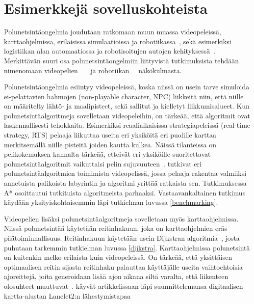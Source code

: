 \section{Esimerkkejä sovelluskohteista}\label{eSuovelluskohteista}
Polunetsintäongelmia joudutaan ratkomaan muun muassa videopeleissä, 
karttaohjelmissa, erilaisissa simulaatioissa ja 
robotiikassa~\cite{ACMHindawi}, sekä esimerkiksi logistiikan alan 
automaatiossa ja robotisoitujen autojen kehityksessä~\cite{arXivMAPF}. 
Merkittävän suuri osa polunetsintäongelmiin liittyvistä tutkimuksista tehdään 
nimenomaan 
videopelien~\cite{MathewAndMalathy}~\cite{ACMHindawi}~\cite{mazeGameTrilogi}
ja robotiikan~\cite{ACMHindawi}~\cite{DelaunayVoronoiAStar} näkökulmasta.\par
	Polunetsintäongelmia esiintyy videopeleissä, koska niissä on usein 
tarve simuloida ei-pelattavien hahmojen (non-playable character, NPC) 
liikkeitä niin, että niille on määritelty lähtö- ja maalipisteet, sekä 
sallitut ja kielletyt liikkumisalueet. Kun polunetsintäalgoritmeja 
sovelletaan videopeleihin, on tärkeää, että algoritmit ovat laskennallisesti 
tehokkaita. Esimerkiksi reaaliaikaisissa strategiapeleissä 
(real-time strategy, RTS) pelaaja liikuttaa useita eri yksiköitä eri puolille 
karttaa merkitsemällä niille pisteitä joiden kautta kulkea. Näissä 
tilanteissa on pelikokemuksen kannalta tärkeää, etteivät eri yksiköille 
suoritettavat polunetsintäalgoritmit vaikuttaisi pelin 
sujuvuuteen~\cite{MathewAndMalathy}. \textcite{mazeGameTrilogi} tutkivat 
eri polunetsintäalgoritmien toimimista videopelissä, jossa pelaaja rakentaa 
valmiiksi annetuista palikoista labyrintin ja algoritmi yrittää ratkaista 
sen. Tutkimuksessa A* osoittautui tutkituista algoritmeista parhaaksi. 
Vastaavankaltainen tutkimus käydään yksityiskohtaisemmin läpi tutkielman 
luvussa \ref{benchmarking}. \par
	Videopelien lisäksi polunetsintäalgoritmeja sovelletaan myös 
karttaohjelmissa. Niissä polunetsintää käytetään reitinhakuun, joka on 
karttaohjelmien eräs päätoiminnallisuus. Reitinhakuun käytetään usein 
Dijkstran algoritmia~\cite{IOPDijkstra}, josta puhutaan tarkemmin tutkielman 
luvussa \ref{dijkstra}. Karttaohjelmissa polunetsintä on kuitenkin melko 
erilaista kuin videopeleissä. On tärkeää, että yksittäisen optimaalisen reitin 
sijasta reitinhaku palauttaa käyttäjälle useita vaihtoehtoisia ajoreittejä, 
joita generoidaan lisää ajon aikana siltä varalta, että liikenteen olosuhteet 
muuttuvat~\cite{Lanelet2}. \textcite{Lanelet2} käyvät artikkelissaan läpi 
suunnittelemansa digitaalisen kartta-alustan Lanelet2:n lähestymistapaa 
